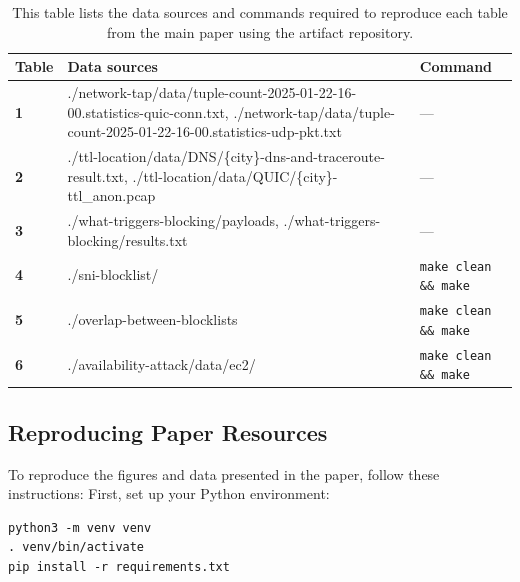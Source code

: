\begin{table}[h!]
    \centering
    \small
    \begin{tabularx}{\linewidth}{|l|X|X|} 
    \hline
    \textbf{Table} & \textbf{Data sources} & \textbf{Command} \\
    \hline
    \textbf{1} & ./network-tap/data/tuple-count-2025-01-22-16-00.statistics-quic-conn.txt, ./network-tap/data/tuple-count-2025-01-22-16-00.statistics-udp-pkt.txt & — \\
    \hline
    \textbf{2} & ./ttl-location/data/DNS/\{city\}-dns-and-traceroute-result.txt, ./ttl-location/data/QUIC/\{city\}-ttl\_anon.pcap & — \\
    \hline
    \textbf{3} & ./what-triggers-blocking/payloads, ./what-triggers-blocking/results.txt & — \\
    \hline
    \textbf{4} & ./sni-blocklist/ & \verb|make clean && make| \\
    \hline
    \textbf{5} & ./overlap-between-blocklists & \verb|make clean && make| \\
    \hline
    \textbf{6} & ./availability-attack/data/ec2/ & \verb|make clean && make| \\

    \hline
    \end{tabularx}
    \label{tab:t2}

    \caption{This table lists the data sources and commands required to reproduce each table from the main paper using the artifact repository.}
\end{table}


\subsection{Reproducing Paper Resources}
\label{sec:reuse}


To reproduce the figures and data presented in the paper, follow these instructions:
First, set up your Python environment:
\begin{verbatim}
python3 -m venv venv
. venv/bin/activate
pip install -r requirements.txt
\end{verbatim}


